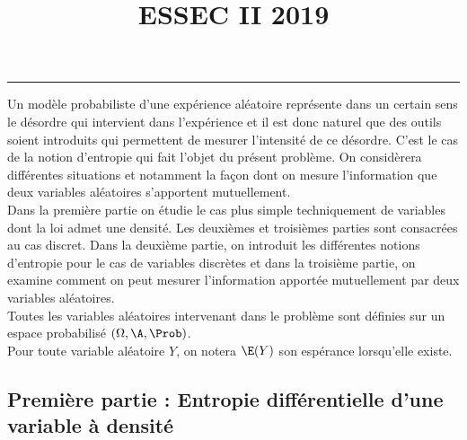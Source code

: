 \documentclass[11pt]{article}%
\title{\bf \vspace{-1.6cm} ESSEC II 2019} %
\author{} %
\date{} %
\begin{document}
\maketitle %
\vspace{-1.2cm}\hrule %
\thispagestyle{fancy}

\vspace*{.4cm}


\noindent %
Un modèle probabiliste d'une expérience aléatoire représente dans un
certain sens le désordre qui intervient dans l'expérience et il est
donc naturel que des outils soient introduits qui permettent de
mesurer l'intensité de ce désordre. C'est le cas de la notion
d'entropie qui fait l'objet du présent problème. On considèrera
différentes situations et notamment la façon dont on mesure
l'information que deux variables aléatoires s'apportent
mutuellement.\\
Dans la première partie on étudie le cas plus simple techniquement de
variables dont la loi admet une densité. Les deuxièmes et troisièmes
parties sont consacrées au cas discret. Dans la deuxième partie, on
introduit les différentes notions d'entropie pour le cas de variables
discrètes et dans la troisième partie, on examine comment on peut
mesurer l'information apportée mutuellement par deux variables
aléatoires.\\
Toutes les variables aléatoires intervenant dans le problème sont
définies sur un espace probabilisé $(\Omega, \A, \Prob)$.\\
Pour toute variable aléatoire $Y$, on notera $\E(Y)$ son espérance
lorsqu'elle existe.


\subsection*{Première partie : Entropie différentielle d'une variable
  à densité}
\end{document}
